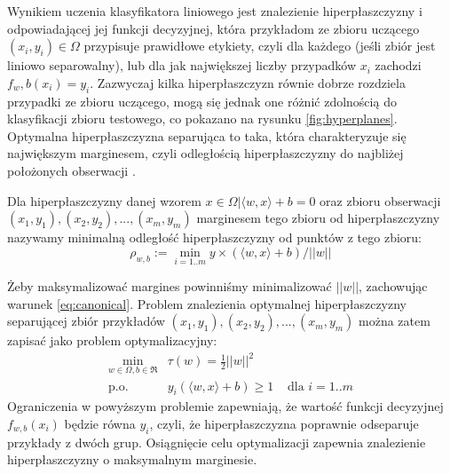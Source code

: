 Wynikiem uczenia klasyfikatora liniowego jest znalezienie hiperpłaszczyzny i odpowiadającej jej funkcji decyzyjnej, która przykładom ze zbioru uczącego $ (x_i, y_i) \in \Omega $ przypisuje prawidłowe etykiety, czyli dla każdego (jeśli zbiór jest liniowo separowalny), lub dla jak największej liczby przypadków $ x_i $ zachodzi  $ f_w,b(x_i) = y_i $. Zazwyczaj kilka hiperpłaszczyzn równie dobrze rozdziela przypadki ze zbioru uczącego, mogą się jednak one różnić zdolnością do klasyfikacji zbioru testowego, co pokazano na rysunku \ref{fig:hyperplanes}. Optymalna hiperpłaszczyzna separująca to taka, która charakteryzuje się największym marginesem, czyli odległością hiperpłaszczyzny do najbliżej położonych obserwacji \cite{scholkopf_learning_2002}.
\begin{definicjaa} Dla hiperpłaszczyzny danej wzorem $ { x \in \Omega | \langle w, x \rangle + b = 0} $ oraz zbioru obserwacji $ {(x_1, y_1), (x_2, y_2), ..., (x_m, y_m)} $ marginesem tego zbioru od hiperpłaszczyzny nazywamy minimalną odległość hiperpłaszczyzny od punktów z tego zbioru:
	\begin{equation}
	\rho_{w,b} := \min_{i=1..m} y \times (\langle w, x \rangle + b) / ||w||
	\label{eq:margin}
	\end{equation}
	
\end{definicjaa}
Żeby maksymalizować margines powinniśmy minimalizować $ ||w|| $, zachowując warunek \ref{eq:canonical}. Problem znalezienia optymalnej hiperpłaszczyzny separującej zbiór przykładów  $ {(x_1, y_1), (x_2, y_2), ..., (x_m, y_m)} $ można zatem zapisać jako problem optymalizacyjny:
\begin{equation}
\begin{array}{lll}
\min\limits_{w \in \Omega, b \in \Re} &  \tau(w) = \frac{1}{2}||w||^2 & \\
\text{p.o.} &  y_i  (\langle w, x \rangle + b) \geq 1 & \text{ dla } i=1..m
\end{array}
\label{eq:primal}
\end{equation}
Ograniczenia w powyższym problemie zapewniają, że wartość funkcji decyzyjnej $ f_{w,b}(x_i) $ będzie równa $  y_i $, czyli, że hiperpłaszczyzna poprawnie odseparuje przykłady z dwóch grup. Osiągnięcie celu optymalizacji zapewnia znalezienie hiperpłaszczyzny o maksymalnym marginesie.

